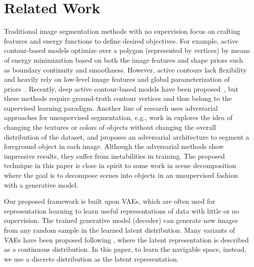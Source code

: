 \documentclass[letterpaper, 10 pt, journal, twoside]{ieeetran}
\begin{document}
\section{Related Work}
Traditional image segmentation methods with no supervision focus on crafting features and energy functions to define desired objectives. For example, active contour-based models \cite{kass1988snakes} optimize over a polygon (represented by vertices) by means of energy minimization based on both the image features and  shape priors such as boundary continuity and smoothness. However, active contours lack flexibility and heavily rely on low-level image features and global parameterization of priors~\cite{marcos2018learning}. Recently, deep active contour-based models have been proposed~\cite{marcos2018learning}, but these  methods require ground-truth contour vertices and thus belong to the supervised learning paradigm. Another line of research uses adversarial approaches for unsupervised segmentation, e.g., work in \cite{chen2019unsupervised} explores the idea of changing the textures or colors of objects without changing the overall distribution of the dataset, and proposes an adversarial architecture to segment a foreground object in each image. Although the adversarial methods show impressive results, they suffer from instabilities in training. The proposed technique in this paper is close in spirit to some work in scene decomposition~\cite{burgess2019monet} where the goal is to decompose scenes into objects in an unsupervised fashion with a generative model. 

Our proposed framework is built upon VAEs,
which are often used for 
representation learning
\cite{tschannen2018recent,bengio2013representation}   to learn useful representations of data with little or no supervision. The trained generative model (decoder) can generate new images from any random sample in the learned latent distribution. Many variants of VAEs have been proposed following \cite{kingma2013auto}, where the latent representation is described as a continuous distribution. In this paper, to learn the navigable space, instead, we use a discrete distribution as the latent representation.
\end{document}
